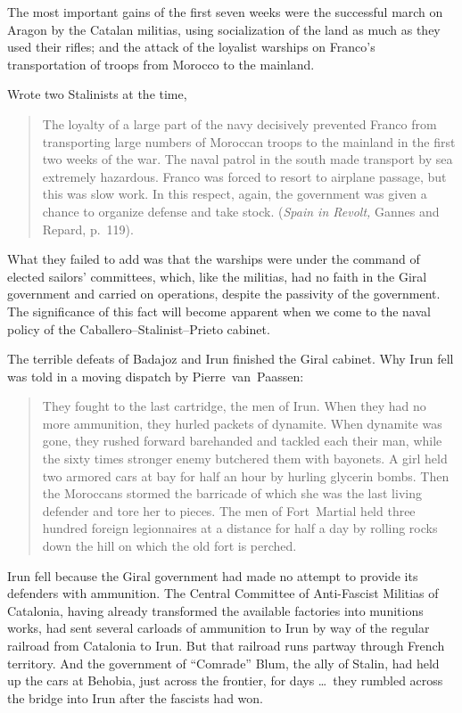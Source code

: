 The most important gains of the first seven weeks were the successful march on Aragon by the Catalan militias, using socialization of the land as much as they used their rifles; and the attack of the loyalist warships on Franco’s transportation of troops from Morocco to the mainland.

Wrote two Stalinists at the time,

\begin{quotation}
  The loyalty of a large part of the navy decisively prevented Franco from transporting large numbers of Moroccan troops to the mainland in the first two weeks of the war. The naval patrol in the south made transport by sea extremely hazardous. Franco was forced to resort to airplane passage, but this was slow work. In this respect, again, the government was given a chance to organize defense and take stock. (\emph{Spain in Revolt,} Gannes and Repard, p.~119).
\end{quotation}

What they failed to add was that the warships were under the command of elected sailors’ committees, which, like the militias, had no faith in the Giral government and carried on operations, despite the passivity of the government. The significance of this fact will become apparent when we come to the naval policy of the Caballero--Stalinist--Prieto cabinet.

The terrible defeats of Badajoz and Irun finished the Giral cabinet. Why Irun fell was told in a moving dispatch by Pierre~van~Paassen:

\begin{quotation}
  They fought to the last cartridge, the men of Irun. When they had no more ammunition, they hurled packets of dynamite. When dynamite was gone, they rushed forward barehanded and tackled each their man, while the sixty times stronger enemy butchered them with bayonets. A girl held two armored cars at bay for half an hour by hurling glycerin bombs. Then the Moroccans stormed the barricade of which she was the last living defender and tore her to pieces. The men of Fort~Martial held three hundred foreign legionnaires at a distance for half a day by rolling rocks down the hill on which the old fort is perched.
\end{quotation}

Irun fell because the Giral government had made no attempt to provide its defenders with ammunition. The Central Committee of Anti-Fascist Militias of Catalonia, having already transformed the available factories into munitions works, had sent several carloads of ammunition to Irun by way of the regular railroad from Catalonia to Irun. But that railroad runs partway through French territory. And the government of ``Comrade'' Blum, the ally of Stalin, had held up the cars at Behobia, just across the frontier, for days \dots\ they rumbled across the bridge into Irun after the fascists had won.

